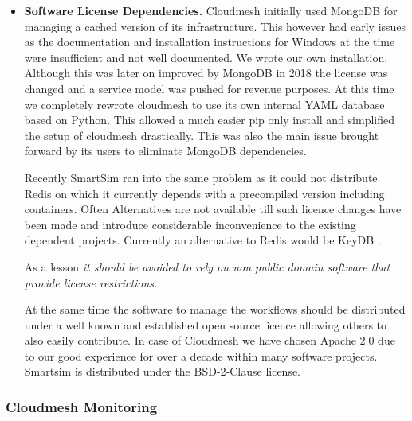 \documentclass[utf8]{FrontiersinVancouver} %
\begin{document}
\begin{itemize}

\item {\bf Software License Dependencies.} Cloudmesh initially used MongoDB for managing a cached version of its infrastructure. This however had early issues as the documentation and installation instructions for Windows at the time were insufficient and not well documented. We wrote our own installation. Although this was later on improved by MongoDB in 2018 the license was changed and a service model was pushed for revenue purposes. At this time we completely rewrote cloudmesh to use its own internal YAML database based on Python. This allowed 
a much easier pip only install and simplified the setup of cloudmesh drastically. This was also the main issue brought forward by its users to eliminate MongoDB dependencies. 

Recently SmartSim ran into the same problem as it could not distribute Redis on which it currently depends with a precompiled version including containers. Often Alternatives are not available till such licence changes have been made and introduce considerable inconvenience to the existing dependent projects. Currently an alternative to Redis would be KeyDB  \citep{keydb}. 

As a lesson {\em it should be avoided to rely on non public domain software that provide license restrictions.}

At the same time the software to manage the workflows should be distributed under a well known and established open source licence allowing others to also easily contribute. In case of Cloudmesh we have chosen Apache 2.0 due to our good experience for over a decade within many software projects.
Smartsim is distributed under the BSD-2-Clause license.

\end{itemize}



\subsubsection{Cloudmesh Monitoring}
\label{sec:monitoring}
\end{document}
